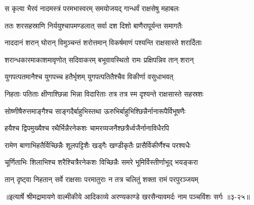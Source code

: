 \twolineshloka
{स कृत्वा भैरवं नादमस्त्रं परमभास्वरम्}
{समयोजयद् गान्धर्वं राक्षसेषु महाबलः} %

\twolineshloka
{ततः शरसहस्राणि निर्ययुश्चापमण्डलात्}
{सर्वा दश दिशो बाणैरापूर्यन्त समागतैः} %

\twolineshloka
{नाददानं शरान् घोरान् विमुञ्चन्तं शरोत्तमान्}
{विकर्षमाणं पश्यन्ति राक्षसास्ते शरार्दिताः} %

\twolineshloka
{शरान्धकारमाकाशमावृणोत् सदिवाकरम्}
{बभूवावस्थितो रामः प्रक्षिपन्निव तान् शरान्} %

\twolineshloka
{युगपत्पतमानैश्च युगपच्च हतैर्भृशम्}
{युगपत्पतितैश्चैव विकीर्णा वसुधाभवत्} %

\twolineshloka
{निहताः पतिताः क्षीणाश्छिन्ना भिन्ना विदारिताः}
{तत्र तत्र स्म दृश्यन्ते राक्षसास्ते सहस्रशः} %

\twolineshloka
{सोष्णीषैरुत्तमाङ्गैश्च साङ्गदैर्बाहुभिस्तथा}
{ऊरुभिर्बाहुभिश्छिन्नैर्नानारूपैर्विभूषणैः} %

\twolineshloka
{हयैश्च द्विपमुख्यैश्च रथैर्भिन्नैरनेकशः}
{चामरव्यजनैश्छत्रैर्ध्वजैर्नानाविधैरपि} %

\twolineshloka
{रामेण बाणाभिहतैर्विच्छिन्नैः शूलपट्टिशैः}
{खड्गैः खण्डीकृतैः प्रासैर्विकीर्णैश्च परश्वधैः} %

\twolineshloka
{चूर्णिताभिः शिलाभिश्च शरैश्चित्रैरनेकशः}
{विच्छिन्नैः समरे भूमिर्विस्तीर्णाभूद् भयङ्करा} %

\twolineshloka
{तान् दृष्ट्वा निहतान् सर्वे राक्षसाः परमातुराः}
{न तत्र चलितुं शक्ता रामं परपुरञ्जयम्} %


॥इत्यार्षे श्रीमद्रामायणे वाल्मीकीये आदिकाव्ये अरण्यकाण्डे खरसैन्यावमर्दः नाम पञ्चविंशः सर्गः ॥३-२५॥
